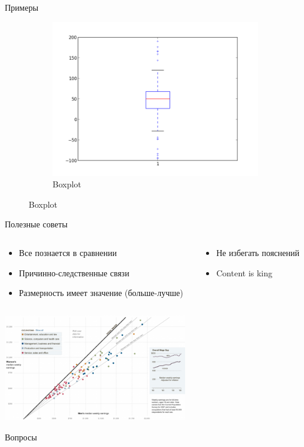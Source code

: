 \documentclass[aspectratio=169]{beamer}
\begin{document}
\begin{frame}{Примеры}
\begin{figure}
\begin{subfigure}[b]{0.3\textwidth}
                \includegraphics[width=\textwidth]{images/box.png}
                \caption{Boxplot}     
        \end{subfigure}
\end{figure}

\end{frame}

\begin{frame}{Полезные советы}

\begin{columns}[T]
    \begin{column}{.5\textwidth}    	
    	\begin{itemize}
		\item Все познается в сравнении
		\item Причинно-следственные связи
		\item Размерность имеет значение (больше-лучше)
		\end{itemize}	
    \end{column}
    \begin{column}{.5\textwidth}
    \begin{itemize}
		\item Не избегать пояснений
		\item Content is king
		\end{itemize}		
    \end{column}
  \end{columns}
  
  \begin{center}
   		\includegraphics[width=0.6\textwidth]{images/salaries.png}
    \end{center}

\end{frame}

\begin{frame}[plain]
\begin{center}
{\Large Вопросы}
\end{center}
\end{frame}
\end{document}
